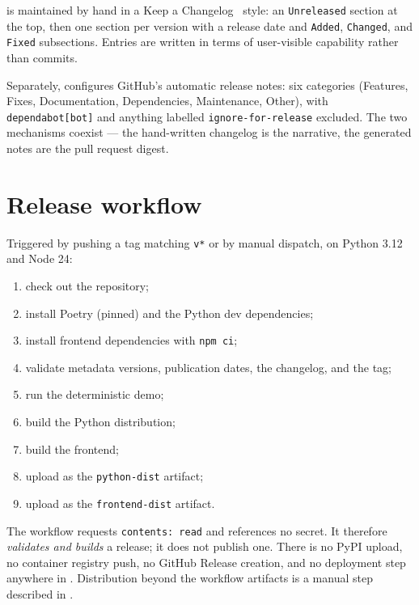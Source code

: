  is maintained by hand in a Keep a
Changelog~\cite{keepachangelog} style: an \texttt{Unreleased} section at the
top, then one section per version with a release date and \texttt{Added},
\texttt{Changed}, and \texttt{Fixed} subsections. Entries are written in terms
of user-visible capability rather than commits.

Separately,  configures GitHub's automatic release
notes: six categories (Features, Fixes, Documentation, Dependencies,
Maintenance, Other), with \texttt{dependabot[bot]} and anything labelled
\texttt{ignore-for-release} excluded. The two mechanisms coexist --- the
hand-written changelog is the narrative, the generated notes are the pull
request digest.

\section{Release workflow}

Triggered by pushing a tag matching \texttt{v*} or by manual dispatch, on
Python 3.12 and Node 24:

\begin{enumerate}[nosep]
  \item check out the repository;
  \item install Poetry (pinned) and the Python dev dependencies;
  \item install frontend dependencies with \texttt{npm ci};
  \item validate metadata versions, publication dates, the changelog, and the tag;
  \item run the deterministic demo;
  \item build the Python distribution;
  \item build the frontend;
  \item upload  as the \texttt{python-dist} artifact;
  \item upload  as the \texttt{frontend-dist} artifact.
\end{enumerate}

The workflow requests \texttt{contents: read} and references no secret. It
therefore \emph{validates and builds} a release; it does not publish one. There
is no PyPI upload, no container registry push, no GitHub Release creation, and
no deployment step anywhere in . Distribution
beyond the workflow artifacts is a manual step described in
.

